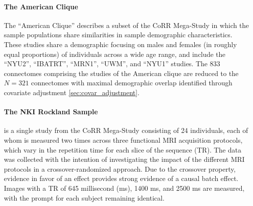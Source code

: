 \paragraph{The American Clique} The ``American Clique'' describes a subset of the CoRR Mega-Study in which the sample populations share similarities in sample demographic characteristics. These studies share a demographic focusing on males and females (in roughly equal proportions) of individuals across a wide age range, and include the ``NYU2'', ``IBATRT'', ``MRN1'', ``UWM'', and ``NYU1'' studies. The $833$ connectomes comprising the studies of the American clique are reduced to the $N=321$ connectomes with maximal demographic overlap identified through covariate adjustment \ref{sec:covar_adjustment}.

\paragraph{The NKI Rockland Sample} \cite{nkirs} is a single study from the CoRR Mega-Study consisting of 24 individuals, each of whom is measured two times across three functional MRI acquisition protocols, which vary in the repetition time for each slice of the sequence (TR). The data was collected with the intention of investigating the impact of the different MRI protocols in a crossover-randomized approach. Due to the crossover property, evidence in favor of an effect provides strong evidence of a causal batch effect. Images with a TR of 645 millisecond (ms), 1400 ms, and 2500 ms are measured, with the prompt for each subject remaining identical.


